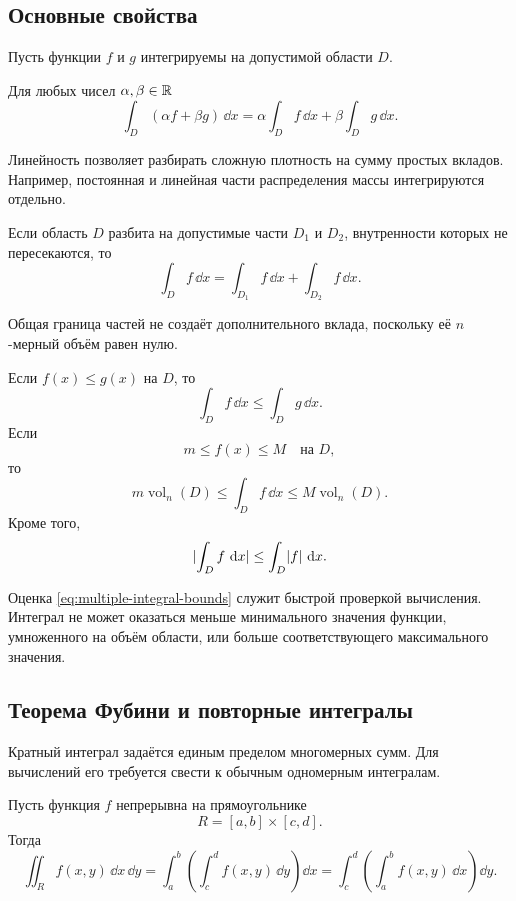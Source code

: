 \subsection{Основные свойства}

Пусть функции $f$ и $g$ интегрируемы на допустимой области $D$.

\begin{theorem}[линейность]
Для любых чисел $\alpha,\beta\in\mathbb{R}$
\[
\int_D(\alpha f+\beta g)\,\dd x
=
\alpha\int_Df\,\dd x
+
\beta\int_Dg\,\dd x.
\]
\end{theorem}

Линейность позволяет разбирать сложную плотность на сумму простых вкладов. Например, постоянная и линейная части распределения массы интегрируются отдельно.

\begin{theorem}
Если область $D$ разбита на допустимые части $D_1$ и $D_2$, внутренности которых не пересекаются, то
\[
\int_D f\,\dd x
=
\int_{D_1}f\,\dd x
+
\int_{D_2}f\,\dd x.
\]
\end{theorem}

Общая граница частей не создаёт дополнительного вклада, поскольку её $n$-мерный объём равен нулю.

\begin{theorem}
Если $f(x)\leq g(x)$ на $D$, то
\[
\int_D f\,\dd x
\leq
\int_D g\,\dd x.
\]
Если
\[
m\leq f(x)\leq M
\quad\text{на }D,
\]
то
\begin{equation}
m\operatorname{vol}_n(D)
\leq
\int_D f\,\dd x
\leq
M\operatorname{vol}_n(D).
\label{eq:multiple-integral-bounds}
\end{equation}
Кроме того,
\[
\lvert\int_Df\,\mathop{}\!\mathrm{d} x\rvert
\leq
\int_D\lvert f\rvert\,\mathop{}\!\mathrm{d} x.
\]
\end{theorem}

Оценка \eqref{eq:multiple-integral-bounds} служит быстрой проверкой вычисления. Интеграл не может оказаться меньше минимального значения функции, умноженного на объём области, или больше соответствующего максимального значения.

\subsection{Теорема Фубини и повторные интегралы}

Кратный интеграл задаётся единым пределом многомерных сумм. Для вычислений его требуется свести к обычным одномерным интегралам.

\begin{theorem}
Пусть функция $f$ непрерывна на прямоугольнике
\[
R=[a,b]\times[c,d].
\]
Тогда
\begin{equation}
\iint_R f(x,y)\,\dd x\,\dd y
=
\int_a^b\left(\int_c^d f(x,y)\,\dd y\right)\dd x
=
\int_c^d\left(\int_a^b f(x,y)\,\dd x\right)\dd y.
\label{eq:fubini-rectangle}
\end{equation}
\end{theorem}

